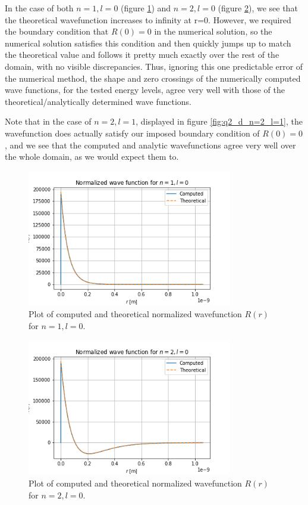 \documentclass{article}
\begin{document}
In the case of both $n=1, l=0$ (figure \ref{fig:q2_d_n=1_l=0}) and $n=2, l=0$ (figure \ref{fig:q2_d_n=2_l=0}), we see that the theoretical wavefunction increases to infinity at r=0. However, we required the boundary condition that $R(0) = 0$ in the numerical solution, so the numerical solution satisfies this condition and then quickly jumps up to match the theoretical value and follows it pretty much exactly over the rest of the domain, with no visible discrepancies. Thus, ignoring this one predictable error of the numerical method, the shape and zero crossings of the numerically computed wave functions, for the tested energy levels, agree very well with those of the theoretical/analytically determined wave functions.

Note that in the case of $n=2, l=1$, displayed in figure \ref{fig:q2_d_n=2_l=1}, the wavefunction does actually satisfy our imposed boundary condition of $R(0) = 0$, and we see that the computed and analytic wavefunctions agree very well over the whole domain, as we would expect them to.

\begin{figure}[H]
	\centering
	\includegraphics[width=0.8\textwidth]{../images/q2_d_n=1_l=0.png}
	\caption{Plot of computed and theoretical normalized wavefunction $R(r)$ for $n=1, l=0$.}
	\label{fig:q2_d_n=1_l=0}
\end{figure}

\begin{figure}[H]
	\centering
	\includegraphics[width=0.8\textwidth]{../images/q2_d_n=2_l=0.png}
	\caption{Plot of computed and theoretical normalized wavefunction $R(r)$ for $n=2, l=0$.}
	\label{fig:q2_d_n=2_l=0}
\end{figure}
\end{document}
